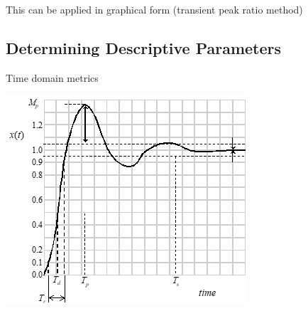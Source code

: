 \documentclass[
]{book}
\begin{document}
This can be applied in graphical form (transient peak ratio method)

\hypertarget{determining-descriptive-parameters}{%
\subsection{Determining Descriptive Parameters}\label{determining-descriptive-parameters}}

Time domain metrics

\includegraphics{media/08/image55.png}
\end{document}
